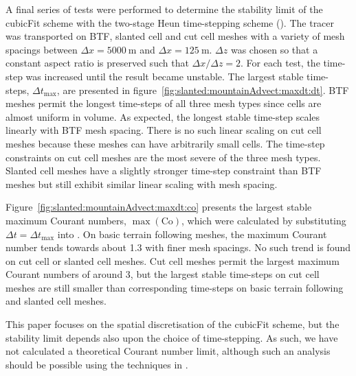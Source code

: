 A final series of tests were performed to determine the stability limit of the cubicFit scheme with the two-stage Heun time-stepping scheme ().
The tracer was transported on BTF, slanted cell and cut cell meshes with a variety of mesh spacings between $\Delta x = \SI{5000}{\meter}$ and $\Delta x = \SI{125}{\meter}$.  $\Delta z$ was chosen so that a constant aspect ratio is preserved such that $\Delta x / \Delta z = 2$.
For each test, the time-step was increased until the result became unstable.  The largest stable time-steps, $\Delta t_\mathrm{max}$, are presented in figure~\ref{fig:slanted:mountainAdvect:maxdt:dt}.
BTF meshes permit the longest time-steps of all three mesh types since cells are almost uniform in volume.  As expected, the longest stable time-step scales linearly with BTF mesh spacing.
There is no such linear scaling on cut cell meshes because these meshes can have arbitrarily small cells.  The time-step constraints on cut cell meshes are the most severe of the three mesh types.  Slanted cell meshes have a slightly stronger time-step constraint than BTF meshes but still exhibit similar linear scaling with mesh spacing.  

Figure~\ref{fig:slanted:mountainAdvect:maxdt:co} presents the largest stable maximum Courant numbers, $\max(\mathrm{Co})$, which were calculated by substituting $\Delta t = \Delta t_\mathrm{max}$ into .
On basic terrain following meshes, the maximum Courant number tends towards about \num{1.3} with finer mesh spacings.
No such trend is found on cut cell or slanted cell meshes.
Cut cell meshes permit the largest maximum Courant numbers of around \num{3}, but the largest stable time-steps on cut cell meshes are still smaller than corresponding time-steps on basic terrain following and slanted cell meshes.

This paper focuses on the spatial discretisation of the cubicFit scheme, but the stability limit depends also upon the choice of time-stepping.  As such, we have not calculated a theoretical Courant number limit, although such an analysis should be possible using the techniques in \citep{baldauf2008}.

